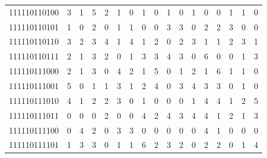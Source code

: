 \documentclass[10pt,a4paper]{article}
\begin{document}
\begin{longtable}{ |c|c|c|c|c|c|c|c|c|c|c|c|c|c|c|c|c| }
    111110110100              & 3                            & 1                                & 5                            & 2                              & 1   & 0   & 1   & 0   & 1   & 0   & 1   & 0   & 0   & 1   & 1   & 0   \\
    111110110101              & 1                            & 0                                & 2                            & 0                              & 1   & 1   & 0   & 0   & 3   & 3   & 0   & 2   & 2   & 3   & 0   & 0   \\
    111110110110              & 3                            & 2                                & 3                            & 4                              & 1   & 4   & 1   & 2   & 0   & 2   & 3   & 1   & 1   & 2   & 3   & 1   \\
    111110110111              & 2                            & 1                                & 3                            & 2                              & 0   & 1   & 3   & 3   & 4   & 3   & 0   & 6   & 0   & 0   & 1   & 3   \\
    111110111000              & 2                            & 1                                & 3                            & 0                              & 4   & 2   & 1   & 5   & 0   & 1   & 2   & 1   & 6   & 1   & 1   & 0   \\
    111110111001              & 5                            & 0                                & 1                            & 1                              & 3   & 1   & 2   & 4   & 0   & 3   & 4   & 3   & 3   & 0   & 1   & 0   \\
    111110111010              & 4                            & 1                                & 2                            & 2                              & 3   & 0   & 1   & 0   & 0   & 0   & 1   & 4   & 4   & 1   & 2   & 5   \\
    111110111011              & 0                            & 0                                & 0                            & 2                              & 0   & 0   & 4   & 2   & 4   & 3   & 4   & 4   & 1   & 2   & 1   & 3   \\
    111110111100              & 0                            & 4                                & 2                            & 0                              & 3   & 3   & 0   & 0   & 0   & 0   & 0   & 4   & 1   & 0   & 0   & 0   \\
    111110111101              & 1                            & 3                                & 3                            & 0                              & 1   & 1   & 6   & 2   & 3   & 2   & 0   & 2   & 2   & 0   & 1   & 4   \\

\end{longtable}
\end{document}
